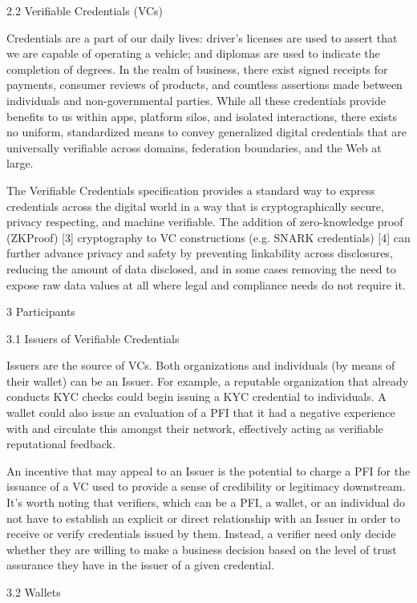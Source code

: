 \documentclass[
]{article}
\begin{document}
2.2 Verifiable Credentials (VCs)

Credentials are a part of our daily lives: driver's licenses are used to
assert that we are capable of operating a vehicle; and diplomas are used
to indicate the completion of degrees. In the realm of business, there
exist signed receipts for payments, consumer reviews of products, and
countless assertions made between individuals and non-governmental
parties. While all these credentials provide benefits to us within apps,
platform silos, and isolated interactions, there exists no uniform,
standardized means to convey generalized digital credentials that are
universally verifiable across domains, federation boundaries, and the
Web at large.

The Verifiable Credentials specification provides a standard way to
express credentials across the digital world in a way that is
cryptographically secure, privacy respecting, and machine verifiable.
The addition of zero-knowledge proof (ZKProof) {[}3{]} cryptography to
VC constructions (e.g. SNARK credentials) {[}4{]} can further advance
privacy and safety by preventing linkability across disclosures,
reducing the amount of data disclosed, and in some cases removing the
need to expose raw data values at all where legal and compliance needs
do not require it.

3 Participants

3.1 Issuers of Verifiable Credentials

Issuers are the source of VCs. Both organizations and individuals (by
means of their wallet) can be an Issuer. For example, a reputable
organization that already conducts KYC checks could begin issuing a KYC
credential to individuals. A wallet could also issue an evaluation of a
PFI that it had a negative experience with and circulate this amongst
their network, effectively acting as verifiable reputational feedback.

An incentive that may appeal to an Issuer is the potential to charge a
PFI for the issuance of a VC used to provide a sense of credibility or
legitimacy downstream. It's worth noting that verifiers, which can be a
PFI, a wallet, or an individual do not have to establish an explicit or
direct relationship with an Issuer in order to receive or verify
credentials issued by them. Instead, a verifier need only decide whether
they are willing to make a business decision based on the level of trust
assurance they have in the issuer of a given credential.

3.2 Wallets
\end{document}
